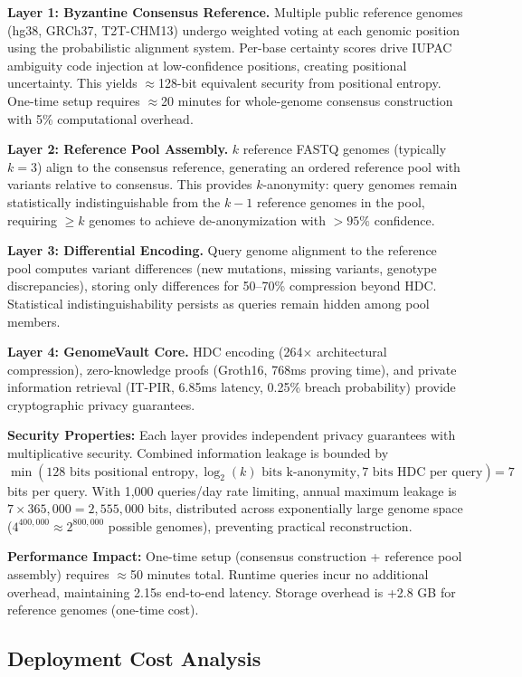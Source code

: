 \documentclass[11pt,letterpaper]{article}
\begin{document}
\textbf{Layer 1: Byzantine Consensus Reference.} Multiple public reference genomes (hg38, GRCh37, T2T-CHM13) undergo weighted voting at each genomic position using the probabilistic alignment system. Per-base certainty scores drive IUPAC ambiguity code injection at low-confidence positions, creating positional uncertainty. This yields $\approx$128-bit equivalent security from positional entropy. One-time setup requires $\approx$20 minutes for whole-genome consensus construction with 5\% computational overhead.

\textbf{Layer 2: Reference Pool Assembly.} $k$ reference FASTQ genomes (typically $k=3$) align to the consensus reference, generating an ordered reference pool with variants relative to consensus. This provides $k$-anonymity: query genomes remain statistically indistinguishable from the $k-1$ reference genomes in the pool, requiring $\geq k$ genomes to achieve de-anonymization with $>95\%$ confidence.

\textbf{Layer 3: Differential Encoding.} Query genome alignment to the reference pool computes variant differences (new mutations, missing variants, genotype discrepancies), storing only differences for 50--70\% compression beyond HDC. Statistical indistinguishability persists as queries remain hidden among pool members.

\textbf{Layer 4: GenomeVault Core.} HDC encoding (264$\times$ architectural compression), zero-knowledge proofs (Groth16, 768ms proving time), and private information retrieval (IT-PIR, 6.85ms latency, 0.25\% breach probability) provide cryptographic privacy guarantees.

\textbf{Security Properties:} Each layer provides independent privacy guarantees with multiplicative security. Combined information leakage is bounded by $\min(128 \text{ bits positional entropy}, \log_2(k) \text{ bits k-anonymity}, 7 \text{ bits HDC per query}) = 7$ bits per query. With 1,000 queries/day rate limiting, annual maximum leakage is $7 \times 365,000 = 2,555,000$ bits, distributed across exponentially large genome space ($4^{400,000} \approx 2^{800,000}$ possible genomes), preventing practical reconstruction.

\textbf{Performance Impact:} One-time setup (consensus construction + reference pool assembly) requires $\approx$50 minutes total. Runtime queries incur no additional overhead, maintaining 2.15s end-to-end latency. Storage overhead is +2.8 GB for reference genomes (one-time cost).

\subsection{Deployment Cost Analysis}
\end{document}
